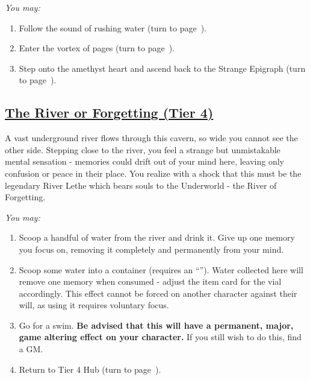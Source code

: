 \documentclass[sheet]{GL2020}
\begin{document}
\vspace{0.5cm}

\begingroup
\itshape
You may:
\begin{enumerate}[A]
  \item Follow the sound of rushing water (turn to page~\pageref{RiverofForgetting}).
	\item Enter the vortex of pages (turn to page~\pageref{HeartoftheLibrary}).
	\item Step onto the amethyst heart and ascend back to the Strange Epigraph (turn to page~\pageref{StrangeEpigraph}).
\end{enumerate}
\endgroup

\clearpage

\begin{center}\section*{\underline{The River or Forgetting (Tier 4)}}\end{center}
\label{RiverofForgetting}

A vast underground river flows through this cavern, so wide you cannot see the other side. Stepping close to the river, you feel a strange but unmistakable mental sensation - memories could drift out of your mind here, leaving only confusion or peace in their place. You realize with a shock that this must be the legendary River Lethe which bears souls to the Underworld - the River of Forgetting.

\vspace{0.5cm}

\begingroup
\itshape
You may:
\begin{enumerate}[A]
  \item Scoop a handful of water from the river and drink it. Give up one memory you focus on, removing it completely and permanently from your mind.
	\item Scoop some water into a container (requires an ``\iGlassVial{}''). Water collected here will remove one memory when consumed - adjust the item card for the vial accordingly. This effect cannot be forced on another character against their will, as using it requires voluntary focus.
	\item Go for a swim.\textbf{ Be advised that this will have a permanent, major, game altering effect on your character.} If you still wish to do this, find a GM.
	\item Return to Tier 4 Hub (turn to page~\pageref{TierFourHub}).
\end{enumerate}
\endgroup
\end{document}
